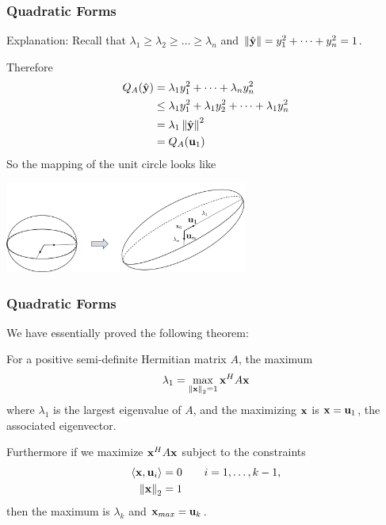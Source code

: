 \documentclass{beamer}
\begin{document}
\begin{frame}\frametitle{Quadratic Forms}
	{\color{blue}Explanation:}
	Recall that $\lambda_1 \geq \lambda_2 \geq \ldots \geq \lambda_n$ and $\left\|\hat{\mathbf{y}} \right\| = y_1^2 + \cdots + y_n^2 = 1$.
	
	\vfill
	
	Therefore
	\begin{align*}
		Q_A(\hat{\mathbf{y}}) 
			&= \lambda_1y_1^2 + \cdots + \lambda_ny_n^2 \\
			&\leq \lambda_1y_1^2 + \lambda_1y_2^2 + \cdots + \lambda_1y_n^2 \\
		&= \lambda_1\left\|\hat{\mathbf{y}}\right\|^2 \\
		&= Q_A(\mathbf{u}_1)
	\end{align*}
	So the mapping of the unit circle looks like
	\begin{center}
		\includegraphics[width=0.6\textwidth]
			{figures/chap6_mapping_2}
	\end{center}
\end{frame}

\begin{frame}\frametitle{Quadratic Forms}
	We have essentially proved the following theorem:
	\begin{theorem}
		For a positive semi-definite Hermitian matrix $A$, the maximum
		\[ 
			\lambda_1 = \max_{\left\|\mathbf{x}\right\|_2=1} \mathbf{x}^H A \mathbf{x} 
		\]
		where $\lambda_1$ is the largest eigenvalue of $A$, and the maximizing $\mathbf{x}$ is $\mathbf{x} = \mathbf{u}_1$, the associated eigenvector.
		
		\vfill
		
		Furthermore if we maximize $\mathbf{x}^H A \mathbf{x}$ subject to the constraints
		\begin{align*}
			\left<\mathbf{x}, \mathbf{u}_i\right> &= 0 \qquad i = 1,\ldots,k-1, \\
			\left\|\mathbf{x}\right\|_2 &= 1 
		\end{align*}
		then the maximum is $\lambda_k$ and $\mathbf{x}_{max} = \mathbf{u}_k$.		
	\end{theorem}
\end{frame}
\end{document}
